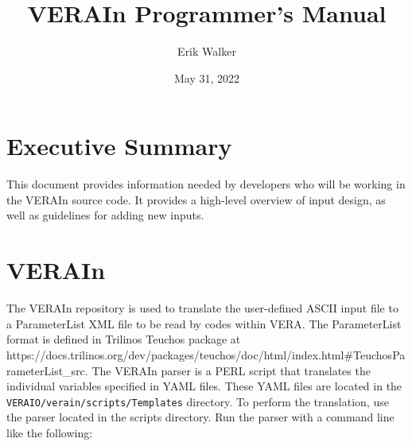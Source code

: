 \documentclass{vera-ornltm}
\author[1]{Erik Walker}
\affil[1]{Oak Ridge National Laboratory}
\title{VERAIn Programmer's Manual}
\date{May 31, 2022}
\renewcommand{\marginpar}[1]{{\small\em\color{note}[#1]}}
\begin{document}
\frontmatter



\section*{Executive Summary}

This document provides information needed by developers who will be working in the VERAIn source code. 
It provides a high-level overview of input design, as well as guidelines for adding new inputs.

\tableofcontents

\mainmatter
\section{VERAIn}

The VERAIn repository is used to translate the user-defined ASCII input file to a ParameterList XML file to be read by codes within VERA. 
The ParameterList format is defined in Trilinos Teuchos package at\\
https://docs.trilinos.org/dev/packages/teuchos/doc/html/index.html\#TeuchosParameterList\_src.
The VERAIn parser is a PERL script that translates the individual variables specified in YAML files. 
These YAML files are located in the \texttt{VERAIO/verain/scripts/Templates} directory.
To perform the translation, use the parser located in the scripts directory. 
Run the parser with a command line like the following:
\end{document}
